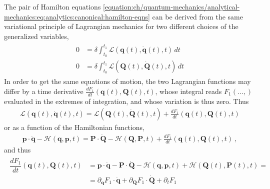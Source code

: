 \documentclass[letterpaper,10pt,english]{jupyterBook}
\begin{document}
\sphinxAtStartPar
The pair of Hamilton equations \eqref{equation:ch/quantum-mechanics/analytical-mechanics:eq:analytics:canonical:hamilton-eqns} can be derived from the same variational principle of Lagrangian mechanics for two different choices of the generalized variables,
\begin{equation*}
\begin{split}\begin{aligned}
  0 & = \delta \int_{t_0}^{t_1} \mathcal{L}(\mathbf{q}(t), \dot{\mathbf{q}}(t), t) \, dt \\
  0 & = \delta \int_{t_0}^{t_1} \mathscr{L}(\mathbf{Q}(t), \dot{\mathbf{Q}}(t), t) \, dt
\end{aligned}\end{split}
\end{equation*}
\sphinxAtStartPar
In order to get the same equations of motion, the two Lagrangian functions may differ by a time derivative \(\frac{d F_1}{dt}(\mathbf{q}(t), \mathbf{Q}(t), t)\), whose integral reads \(F_1(\dots,)\) evaluated in the extremes of integration, and whose variation is thus zero. Thus
\begin{equation*}
\begin{split}\mathcal{L}(\mathbf{q}(t), \dot{\mathbf{q}}(t), t) = \mathscr{L}(\mathbf{Q}(t), \dot{\mathbf{Q}}(t), t) + \frac{d F_1}{dt}(\mathbf{q}(t), \mathbf{Q}(t), t)\end{split}
\end{equation*}
\sphinxAtStartPar
or as a function of the Hamiltonian functions,
\begin{equation*}
\begin{split}\mathbf{p} \cdot \dot{\mathbf{q}} -\mathcal{H}(\mathbf{q}, \mathbf{p}, t) = \mathbf{P} \cdot \dot{\mathbf{Q}} - \mathscr{H}(\mathbf{Q}, \mathbf{P}, t) + \frac{d F_1}{dt}(\mathbf{q}(t), \mathbf{Q}(t), t) \ ,\end{split}
\end{equation*}
\sphinxAtStartPar
and thus
\begin{equation*}
\begin{split}\begin{aligned}
  \dfrac{d F_1}{dt}(\mathbf{q}(t), \mathbf{Q}(t), t)
  & = \mathbf{p} \cdot \dot{\mathbf{q}} - \mathbf{P} \cdot \dot{\mathbf{Q}} - \mathcal{H}(\mathbf{q}, \mathbf{p}, t) + \mathscr{H}(\mathbf{Q}(t), \mathbf{P}(t),t) = \\
  & = \partial_\mathbf{q} F_1 \cdot \dot{\mathbf{q}} + \partial_\mathbf{Q} F_1 \cdot \dot{\mathbf{Q}} + \partial_t F_1
\end{aligned}\end{split}
\end{equation*}
\end{document}
